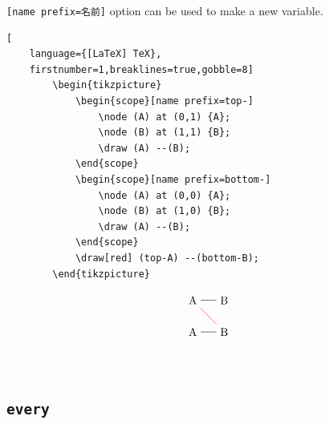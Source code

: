 \documentclass[lualatex]{jlreq}
\begin{document}
\verb|[name prefix=名前]| option can be used to make a new variable.
\\[1em]
\begin{minipage}{0.78 \textwidth}
    \begin{lstlisting}[
    language={[LaTeX] TeX},
    firstnumber=1,breaklines=true,gobble=8]
        \begin{tikzpicture}
            \begin{scope}[name prefix=top-]
                \node (A) at (0,1) {A};
                \node (B) at (1,1) {B};
                \draw (A) --(B);
            \end{scope}
            \begin{scope}[name prefix=bottom-]
                \node (A) at (0,0) {A};
                \node (B) at (1,0) {B};
                \draw (A) --(B);
            \end{scope}
            \draw[red] (top-A) --(bottom-B);
        \end{tikzpicture}
    \end{lstlisting}
\end{minipage}
\hfill
\begin{minipage}{0.18 \textwidth}
    \[
        \begin{tikzpicture}
            \begin{scope}[name prefix=top-]
                \node (A) at (0,1) {A};
                \node (B) at (1,1) {B};
                \draw (A) --(B);
            \end{scope}
            \begin{scope}[name prefix=bottom-]
                \node (A) at (0,0) {A};
                \node (B) at (1,0) {B};
                \draw (A) --(B);
            \end{scope}
            \draw[red] (top-A) --(bottom-B);
        \end{tikzpicture}
    \]
\end{minipage}
\\[1em]

\subsection{\texttt{every}}
\end{document}
